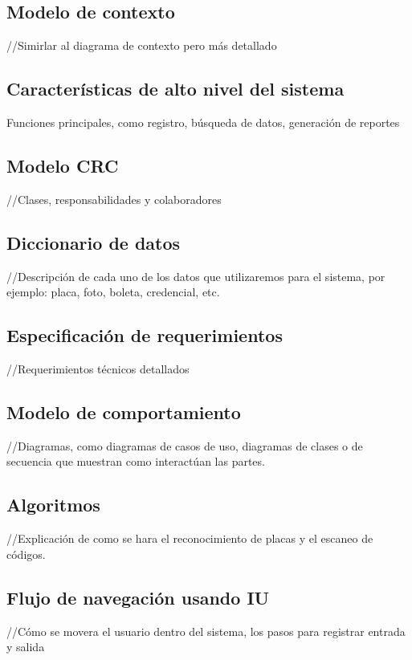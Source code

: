 \documentclass[12pt, letterpaper]{article}
\begin{document}
\subsection{Modelo de contexto}
//Simirlar al diagrama de contexto pero más detallado\\

\subsection{Características de alto nivel del sistema}
Funciones principales, como registro, búsqueda de datos, generación de reportes\\

\subsection{Modelo CRC}
//Clases, responsabilidades y colaboradores\\

\subsection{Diccionario de datos}
//Descripción de cada uno de los datos que utilizaremos para el sistema, por ejemplo: placa, foto, boleta, credencial, etc.\\

\subsection{Especificación de requerimientos}
//Requerimientos técnicos detallados\\

\subsection{Modelo de comportamiento}
//Diagramas, como diagramas de casos de uso, diagramas de clases o de secuencia que muestran como interactúan las partes.\\

\subsection{Algoritmos}
//Explicación de como se hara el reconocimiento de placas y el escaneo de códigos.\\

\subsection{Flujo de navegación usando IU}
//Cómo se movera el usuario dentro del sistema, los pasos para registrar entrada y salida\\
\end{document}
